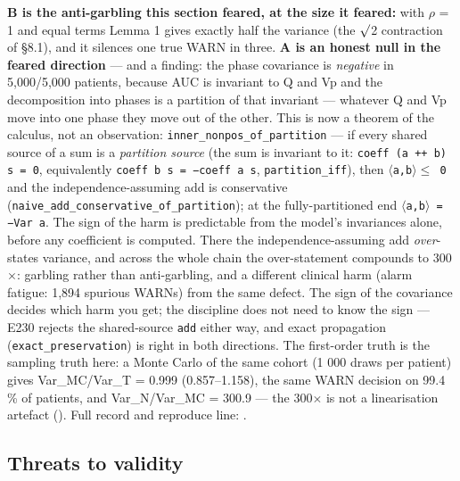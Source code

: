 \documentclass[sigplan,review,anonymous,10pt]{acmart}
\begin{document}
\textbf{B is the anti-garbling this section feared, at the size it feared:} with $\rho$ = 1 and equal terms Lemma 1 gives exactly half the variance (the $\surd$2 contraction of §8.1), and it silences one true WARN in three. \textbf{A is an honest null in the feared direction} --- and a finding: the phase covariance is \emph{negative} in 5,000/5,000 patients, because AUC is invariant to Q and Vp and the decomposition into phases is a partition of that invariant --- whatever Q and Vp move into one phase they move out of the other. This is now a theorem of the calculus, not an observation: \texttt{inner\_nonpos\_of\_partition} --- if every shared source of a sum is a \emph{partition source} (the sum is invariant to it: \texttt{coeff (a ++ b) s = 0}, equivalently \texttt{coeff b s = −coeff a s}, \texttt{partition\_iff}), then \texttt{$\langle$a,b$\rangle\leq$ 0} and the independence-assuming add is conservative (\texttt{naive\_add\_conservative\_of\_partition}); at the fully-partitioned end \texttt{$\langle$a,b$\rangle$ = −Var a}. The sign of the harm is predictable from the model's invariances alone, before any coefficient is computed. There the independence-assuming add \emph{over}-states variance, and across the whole chain the over-statement compounds to 300$\times$: garbling rather than anti-garbling, and a different clinical harm (alarm fatigue: 1,894 spurious WARNs) from the same defect. The sign of the covariance decides which harm you get; the discipline does not need to know the sign --- E230 rejects the shared-source \texttt{add} either way, and exact propagation (\texttt{exact\_preservation}) is right in both directions. The first-order truth is the sampling truth here: a Monte Carlo of the same cohort (1 000 draws per patient) gives Var\_MC/Var\_T = 0.999 (0.857--1.158), the same WARN decision on 99.4 \% of patients, and Var\_N/Var\_MC = 300.9 --- the 300$\times$ is not a linearisation artefact (). Full record and reproduce line: .

\subsection{Threats to validity}
\end{document}
